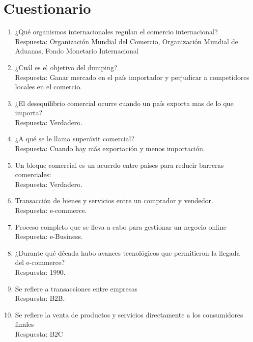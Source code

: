 \documentclass[a4paper,12pt]{article}
\begin{document}
\section*{Cuestionario}
\begin{enumerate}
\item ¿Qué organismos internacionales regulan el comercio internacional? \\
Respuesta: Organización Mundial del Comercio, Organización Mundial de Aduanas, Fondo Monetario Internacional 
\item ¿Cuál es el objetivo del dumping? \\
Respuesta: Ganar mercado en el país importador y perjudicar a competidores locales en el comercio.
\item ¿El desequilibrio comercial ocurre cuando un país exporta mas de lo que importa? \\
Respuesta: Verdadero.
\item ¿A qué se le llama superávit comercial? \\
Respuesta: Cuando hay más exportación y menos importación.
\item Un bloque comercial es un acuerdo entre países para reducir barreras comerciales: \\
	Respuesta: Verdadero.
\item Transacción de bienes y servicios entre un comprador y vendedor. \\
Respuesta: e-commerce.
\item Proceso completo que se lleva a cabo para gestionar un negocio online \\
Respuesta: e-Business.
\item ¿Durante qué década hubo avances tecnológicos que permitieron la llegada del e-commerce? \\
Respuesta: 1990.
\item Se refiere a transacciones entre empresas \\
Respuesta: B2B.
\item Se refiere la venta de productos y servicios directamente a los consumidores finales \\
Respuesta: B2C

\end{enumerate}


\newpage
\end{document}
